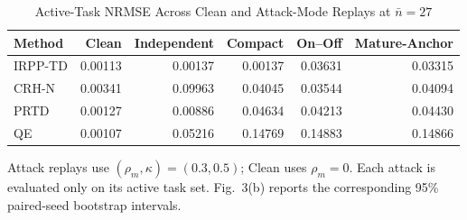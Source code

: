 \documentclass[journal]{IEEEtran}
\begin{document}
\begin{table}[!t]
\centering
\caption{Active-Task NRMSE Across Clean and Attack-Mode Replays at
$\bar n=27$}
\label{tab:rq3-mode-methods}
\scriptsize
\setlength{\tabcolsep}{8.0pt}
\renewcommand{\arraystretch}{1.05}
\begin{tabular}{lrrrrr}
\toprule
Method & Clean & Independent & Compact & On--Off & Mature-Anchor \\
\midrule
IRPP-TD & 0.00113 & 0.00137 & 0.00137 & 0.03631 & 0.03315 \\
CRH-N   & 0.00341 & 0.09963 & 0.04045 & 0.03544 & 0.04094 \\
PRTD    & 0.00127 & 0.00886 & 0.04634 & 0.04213 & 0.04430 \\
QE      & 0.00107 & 0.05216 & 0.14769 & 0.14883 & 0.14866 \\
\bottomrule
\end{tabular}
\par\vspace{0.4ex}
\parbox{0.91\textwidth}{\scriptsize Attack replays use
$(\rho_m,\kappa)=(0.3,0.5)$; Clean uses $\rho_m=0$. Each attack is evaluated
only on its active task set. Fig.~3(b) reports the corresponding 95\%
paired-seed bootstrap intervals.}
\end{table}
\end{document}
